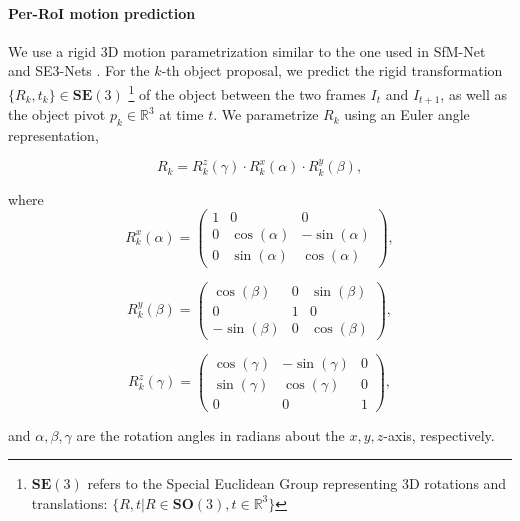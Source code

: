 \paragraph{Per-RoI motion prediction}
We use a rigid 3D motion parametrization similar to the one used in SfM-Net and SE3-Nets \cite{SfmNet,SE3Nets}.
For the $k$-th object proposal, we predict the rigid transformation $\{R_k, t_k\}\in \mathbf{SE}(3)$
\footnote{$\mathbf{SE}(3)$ refers to the Special Euclidean Group representing 3D rotations
and translations: $\{R, t|R \in \mathbf{SO}(3), t \in \mathbb{R}^3\}$}
of the object between the two frames $I_t$ and $I_{t+1}$, as well as the object pivot $p_k \in \mathbb{R}^3$ at time $t$.
We parametrize ${R_k}$ using an Euler angle representation,

\begin{equation}
R_k = R_k^z(\gamma) \cdot R_k^x(\alpha) \cdot R_k^y(\beta),
\end{equation}

where
\begin{equation}
R_k^x(\alpha) =
\begin{pmatrix}
  1 & 0 & 0 \\
  0 & \cos(\alpha) & -\sin(\alpha) \\
  0 & \sin(\alpha) & \cos(\alpha)
\end{pmatrix},
\end{equation}

\begin{equation}
R_k^y(\beta) =
\begin{pmatrix}
  \cos(\beta) & 0 & \sin(\beta) \\
  0 & 1 & 0 \\
  -\sin(\beta) & 0 & \cos(\beta)
\end{pmatrix},
\end{equation}

\begin{equation}
R_k^z(\gamma) =
\begin{pmatrix}
  \cos(\gamma) & -\sin(\gamma) & 0 \\
  \sin(\gamma) & \cos(\gamma) & 0 \\
  0 & 0 & 1
\end{pmatrix},
\end{equation}

and $\alpha, \beta, \gamma$ are the rotation angles in radians about the $x,y,z$-axis, respectively.

